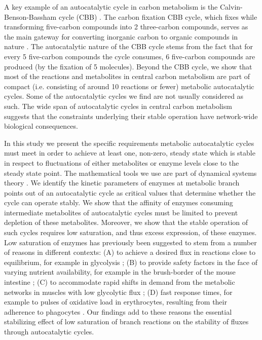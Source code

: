     A key example of an autocatalytic cycle in carbon metabolism is the Calvin-Benson-Bassham cycle (CBB) \cite{Benson1950-cl}.
    The carbon fixation CBB cycle, which fixes  while transforming five-carbon compounds into 2 three-carbon compounds, serves as the main gateway for converting inorganic carbon to organic compounds in nature \cite{Raven2012-le}.
    The autocatalytic nature of the CBB cycle stems from the fact that for every 5 five-carbon compounds the cycle consumes, 6 five-carbon compounds are produced (by the fixation of 5  molecules).
    Beyond the CBB cycle, we show that most of the reactions and metabolites in central carbon metabolism are part of compact (i.e. consisting of around 10 reactions or fewer) metabolic autocatalytic cycles.
    Some of the autocatalytic cycles we find are not usually considered as such.
    The wide span of autocatalytic cycles in central carbon metabolism suggests that the constraints underlying their stable operation have network-wide biological consequences.

    In this study we present the specific requirements metabolic autocatalytic cycles must meet in order to achieve at least one, non-zero, steady state which is stable in respect to fluctuations of either metabolites or enzyme levels close to the steady state point.
    The mathematical tools we use are part of dynamical systems theory \cite{Strogatz2014-hp}.
    We identify the kinetic parameters of enzymes at metabolic branch points out of an autocatalytic cycle as critical values that determine whether the cycle can operate stably.
    We show that the affinity of enzymes consuming intermediate metabolites of autocatalytic cycles must be limited to prevent depletion of these metabolites.
    Moreover, we show that the stable operation of such cycles requires low saturation, and thus excess expression, of these enzymes.
    Low saturation of enzymes has previously been suggested to stem from a number of reasons in different contexts:
    (A) to achieve a desired flux in reactions close to equilibrium, for example in glycolysis \cite{Staples1997-fq,Eanes2006-gh,Flamholz2013-bb};
    (B) to provide safety factors in the face of varying nutrient availability, for example in the brush-border of the mouse intestine \cite{Weiss1998-gp};
    (C) to accommodate rapid shifts in demand from the metabolic networks in muscles with low glycolytic flux \cite{Suarez1997-jo};
    (D) fast response times, for example to pulses of oxidative load in erythrocytes, resulting from their adherence to phagocytes \cite{Salvador2003-fc}.
    Our findings add to these reasons the essential stabilizing effect of low saturation of branch reactions on the stability of fluxes through autocatalytic cycles.

